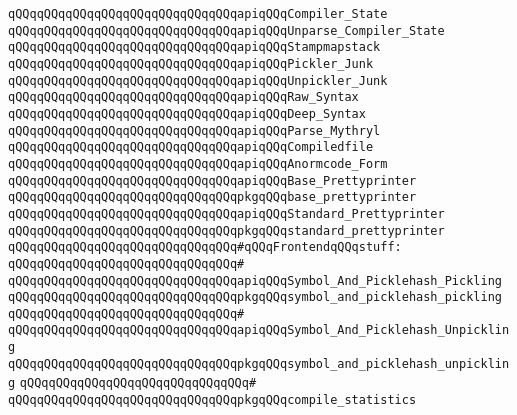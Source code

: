 \verb|qQQqqQQqqQQqqQQqqQQqqQQqqQQqqQQqapiqQQqCompiler_State|\newline
\verb|qQQqqQQqqQQqqQQqqQQqqQQqqQQqqQQqapiqQQqUnparse_Compiler_State|\newline
\verb|qQQqqQQqqQQqqQQqqQQqqQQqqQQqqQQqapiqQQqStampmapstack|\newline
\verb|qQQqqQQqqQQqqQQqqQQqqQQqqQQqqQQqapiqQQqPickler_Junk|\newline
\verb|qQQqqQQqqQQqqQQqqQQqqQQqqQQqqQQqapiqQQqUnpickler_Junk|\newline
\verb|qQQqqQQqqQQqqQQqqQQqqQQqqQQqqQQqapiqQQqRaw_Syntax|\newline
\verb|qQQqqQQqqQQqqQQqqQQqqQQqqQQqqQQqapiqQQqDeep_Syntax|\newline
\verb|qQQqqQQqqQQqqQQqqQQqqQQqqQQqqQQqapiqQQqParse_Mythryl|\newline
\verb|qQQqqQQqqQQqqQQqqQQqqQQqqQQqqQQqapiqQQqCompiledfile|\newline
\verb|qQQqqQQqqQQqqQQqqQQqqQQqqQQqqQQqapiqQQqAnormcode_Form|\newline
\newline
\verb|qQQqqQQqqQQqqQQqqQQqqQQqqQQqqQQqapiqQQqBase_Prettyprinter|\newline
\verb|qQQqqQQqqQQqqQQqqQQqqQQqqQQqqQQqpkgqQQqbase_prettyprinter|\newline
\newline
\verb|qQQqqQQqqQQqqQQqqQQqqQQqqQQqqQQqapiqQQqStandard_Prettyprinter|\newline
\verb|qQQqqQQqqQQqqQQqqQQqqQQqqQQqqQQqpkgqQQqstandard_prettyprinter|\newline
\newline
\verb|qQQqqQQqqQQqqQQqqQQqqQQqqQQqqQQq#qQQqFrontendqQQqstuff:|\newline
\verb|qQQqqQQqqQQqqQQqqQQqqQQqqQQqqQQq#|\newline
\verb|qQQqqQQqqQQqqQQqqQQqqQQqqQQqqQQqapiqQQqSymbol_And_Picklehash_Pickling|\newline
\verb|qQQqqQQqqQQqqQQqqQQqqQQqqQQqqQQqpkgqQQqsymbol_and_picklehash_pickling|\newline
\verb|qQQqqQQqqQQqqQQqqQQqqQQqqQQqqQQq#|\newline
\verb|qQQqqQQqqQQqqQQqqQQqqQQqqQQqqQQqapiqQQqSymbol_And_Picklehash_Unpickling|\newline
\verb|qQQqqQQqqQQqqQQqqQQqqQQqqQQqqQQqpkgqQQqsymbol_and_picklehash_unpickling|\newline
\verb|qQQqqQQqqQQqqQQqqQQqqQQqqQQqqQQq#|\newline
\verb|qQQqqQQqqQQqqQQqqQQqqQQqqQQqqQQqpkgqQQqcompile_statistics|\newline
